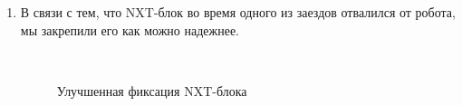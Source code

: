\begin{enumerate}
	\item В связи с тем, что NXT-блок во время одного из заездов отвалился от робота, мы закрепили его как можно надежнее.
	
	\begin{figure}[H]
		\begin{minipage}[h]{0.2\linewidth}
			\center  
		\end{minipage}
		\begin{minipage}[h]{0.6\linewidth}
			\caption{Улучшенная фиксация NXT-блока}
		\end{minipage}
	\end{figure}
	
\end{enumerate}
\fillpage